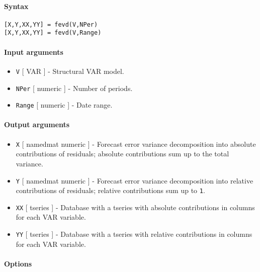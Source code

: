 


	\paragraph{Syntax}

\begin{verbatim}
[X,Y,XX,YY] = fevd(V,NPer)
[X,Y,XX,YY] = fevd(V,Range)
\end{verbatim}

\paragraph{Input arguments}

\begin{itemize}
\item
  \texttt{V} {[} VAR {]} - Structural VAR model.
\item
  \texttt{NPer} {[} numeric {]} - Number of periods.
\item
  \texttt{Range} {[} numeric {]} - Date range.
\end{itemize}

\paragraph{Output arguments}

\begin{itemize}
\item
  \texttt{X} {[} namedmat \textbar{} numeric {]} - Forecast error
  variance decomposition into absolute contributions of residuals;
  absolute contributions sum up to the total variance.
\item
  \texttt{Y} {[} namedmat \textbar{} numeric {]} - Forecast error
  variance decomposition into relative contributions of residuals;
  relative contributions sum up to \texttt{1}.
\item
  \texttt{XX} {[} tseries {]} - Database with a tseries with absolute
  contributions in columns for each VAR variable.
\item
  \texttt{YY} {[} tseries {]} - Database with a tseries with relative
  contributions in columns for each VAR variable.
\end{itemize}

\paragraph{Options}

